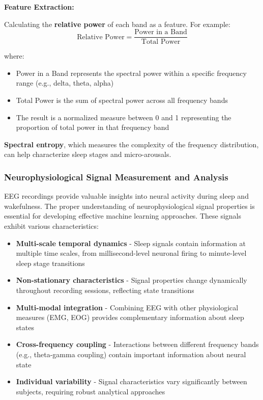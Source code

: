 \documentclass[a4paper,12pt,twoside]{article}
\begin{document}
\begin{enumerate}
        \textbf{Feature Extraction:}
            
            Calculating the \textbf{relative power} of each band as a feature. For example:
            \begin{equation}
        \text{Relative Power} = \frac{\text{Power in a Band}}{\text{Total Power}}                      \label{eq:relative_power}
                    \end{equation}
        
        where:
        \begin{itemize}
            \item Power in a Band represents the spectral power within a specific frequency range (e.g., delta, theta, alpha)
            \item Total Power is the sum of spectral power across all frequency bands
            \item The result is a normalized measure between 0 and 1 representing the proportion of total power in that frequency band
        \end{itemize}
        
            \textbf{Spectral entropy}, which measures the complexity of the frequency distribution, can help characterize sleep stages and micro-arousals.
\end{enumerate}

\subsubsection{Neurophysiological Signal Measurement and Analysis}

EEG recordings provide valuable insights into neural activity during sleep and wakefulness. The proper understanding of neurophysiological signal properties is essential for developing effective machine learning approaches. These signals exhibit various characteristics:

\begin{itemize}
    \item \textbf{Multi-scale temporal dynamics} - Sleep signals contain information at multiple time scales, from millisecond-level neuronal firing to minute-level sleep stage transitions
    
    \item \textbf{Non-stationary characteristics} - Signal properties change dynamically throughout recording sessions, reflecting state transitions
    
    \item \textbf{Multi-modal integration} - Combining EEG with other physiological measures (EMG, EOG) provides complementary information about sleep states
    
    \item \textbf{Cross-frequency coupling} - Interactions between different frequency bands (e.g., theta-gamma coupling) contain important information about neural state
    
    \item \textbf{Individual variability} - Signal characteristics vary significantly between subjects, requiring robust analytical approaches
\end{itemize}
\end{document}
